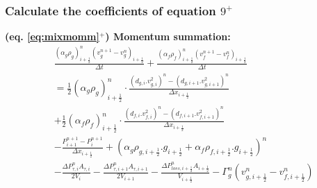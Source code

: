 \documentclass[11pt,letterpaper,titlepage]{article}
\newcommand{\half}{\frac{1}{2}}
\begin{document}
\newpage
\subsubsection{Calculate the coefficients of equation $9^+$}
\textbf{(eq. \ref{eq:mixmomm}$^+$) Momentum summation:}
\begin{equation*}
\begin{aligned}
&\frac{(\alpha_g\rho_g )_{i+\half}^{n} (v_g^{n+1}-v_g^{n})_{i+\half}}{\Delta t}+\frac{(\alpha_f\rho_f )_{i+\half}^{n} (v_f^{n+1}-v_f^{n})_{i+\half}}{\Delta t}\\
&=\half (\alpha_g \rho_{g})_{i+\half}^n \cdot\frac{(d_{g,i}.v_{g,i}^2)^n-(d_{g,i+1}.v_{g,i+1}^2)^n}{\Delta x_{i+\half}} \\
&+\half (\alpha_f \rho_{f})_{i+\half}^n \cdot\frac{(d_{f,i}.v_{f,i}^2)^n-(d_{f,i+1}.v_{f,i+1}^2)^n}{\Delta x_{i+\half}} \\
&-\frac{P_{i+1}^{n+1}-P_i^{n+1}}{\Delta x_{i+\half}} + (\alpha_g \rho_{g,i+\half}.g_{i+\half} + \alpha_f\rho_{f,i+\half}.g_{i+\half})^n\\
&-\frac{\Delta P_{\tau,i}^n A_{\tau,i}}{2V_i}-\frac{\Delta P_{\tau,i+1}^n A_{\tau,i+1}}{2V_{i+1}} 
-\frac{\Delta P_{loss,i+\half}^n A_{i+\half}}{V_{i+\half}} - \Gamma_g^n (v_{g,i+\half}^n - v_{f,i+\half}^n)
\end{aligned}
\end{equation*}
\newline

\end{document}

